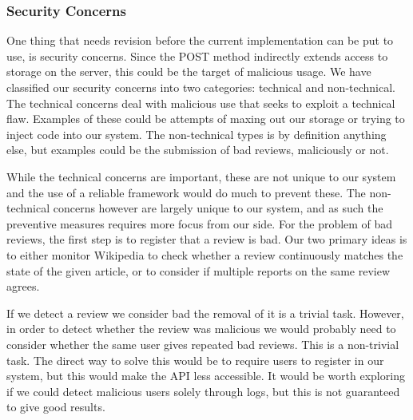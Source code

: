 \subsubsection{Security Concerns}

One thing that needs revision before the current implementation can be put to use, is security concerns. Since the POST method indirectly extends access to storage on the server, this could be the target of malicious usage. We have classified our security concerns into two categories: technical and non-technical. The technical concerns deal with malicious use that seeks to exploit a technical flaw. Examples of these could be attempts of maxing out our storage or trying to inject code into our system. The non-technical types is by definition anything else, but examples could be the submission of bad reviews, maliciously or not.

While the technical concerns are important, these are not unique to our system and the use of a reliable framework would do much to prevent these. The non-technical concerns however are largely unique to our system, and as such the preventive measures requires more focus from our side. For the problem of bad reviews, the first step is to register that a review is bad. Our two primary ideas is to either monitor Wikipedia to check whether a review continuously matches the state of the given article, or to consider if multiple reports on the same review agrees.

If we detect a review we consider bad the removal of it is a trivial task. However, in order to detect whether the review was malicious we would probably need to consider whether the same user gives repeated bad reviews. This is a non-trivial task. The direct way to solve this would be to require users to register in our system, but this would make the API less accessible. It would be worth exploring if we could detect malicious users solely through logs, but this is not guaranteed to give good results.
